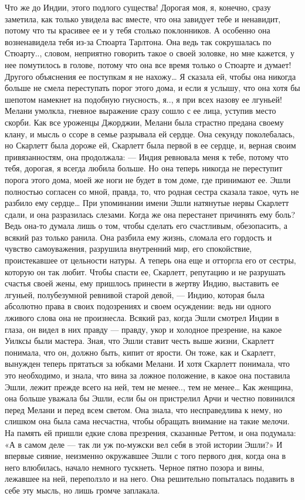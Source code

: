 Что же до Индии, этого подлого существа! Дорогая моя, я, конечно, сразу заметила, как только увидела вас вместе, что она завидует тебе и ненавидит, потому что ты красивее ее и у тебя столько поклонников. А особенно она возненавидела тебя из-за Стюарта Тарлтона. Она ведь так сокрушалась по Стюарту.., словом, неприятно говорить такое о своей золовке, но мне кажется, у нее помутилось в голове, потому что она все время только о Стюарте и думает! Другого объяснения ее поступкам я не нахожу… Я сказала ей, чтобы она никогда больше не смела переступать порог этого дома, и если я услышу, что она хотя бы шепотом намекнет на подобную гнусность, я.., я при всех назову ее лгуньей!
Мелани умолкла, гневное выражение сразу сошло с ее лица, уступив место скорби. Как все уроженцы Джорджии, Мелани была страстно предана своему клану, и мысль о ссоре в семье разрывала ей сердце. Она секунду поколебалась, но Скарлетт была дороже ей, Скарлетт была первой в ее сердце, и, верная своим привязанностям, она продолжала:
— Индия ревновала меня к тебе, потому что тебя, дорогая, я всегда любила больше. Но она теперь никогда не переступит порога этого дома, моей же ноги не будет в том доме, где принимают ее. Эшли полностью согласен со мной, правда, то, что родная сестра сказала такое, чуть не разбило ему сердце…
При упоминании имени Эшли натянутые нервы Скарлетт сдали, и она разразилась слезами. Когда же она перестанет причинять ему боль? Ведь она-то думала лишь о том, чтобы сделать его счастливым, обезопасить, а всякий раз только ранила. Она разбила ему жизнь, сломала его гордость и чувство самоуважения, разрушила внутренний мир, его спокойствие, проистекавшее от цельности натуры. А теперь она еще и отторгла его от сестры, которую он так любит. Чтобы спасти ее, Скарлетт, репутацию и не разрушать счастья своей жены, ему пришлось принести в жертву Индию, выставить ее лгуньей, полубезумной ревнивой старой девой, — Индию, которая была абсолютно права в своих подозрениях и своем осуждении: ведь ни одного лживого слова она не произнесла. Всякий раз, когда Эшли смотрел Индии в глаза, он видел в них правду — правду, укор и холодное презрение, на какое Уилксы были мастера.
Зная, что Эшли ставит честь выше жизни, Скарлетт понимала, что он, должно быть, кипит от ярости. Он тоже, как и Скарлетт, вынужден теперь прятаться за юбками Мелани. И хотя Скарлетт понимала, что это необходимо, и знала, что вина за ложное положение, в какое она поставила Эшли, лежит прежде всего на ней, тем не менее.., тем не менее… Как женщина, она больше уважала бы Эшли, если бы он пристрелил Арчи и честно повинился перед Мелани и перед всем светом. Она знала, что несправедлива к нему, но слишком она была сама несчастна, чтобы обращать внимание на такие мелочи. На память ей пришли едкие слова презрения, сказанные Реттом, и она подумала: «А в самом деле — так ли уж по-мужски вел себя в этой истории Эшли?» И впервые сияние, неизменно окружавшее Эшли с того первого дня, когда она в него влюбилась, начало немного тускнеть. Черное пятно позора и вины, лежавшее на ней, переползло и на него. Она решительно попыталась подавить в себе эту мысль, но лишь громче заплакала.
